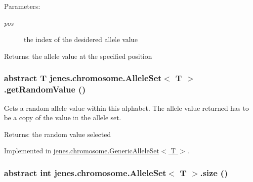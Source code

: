 \begin{Desc}
\item[Parameters:]
\begin{description}
\item[{\em pos}]the index of the desidered allele value \end{description}
\end{Desc}
\begin{Desc}
\item[Returns:]the allele value at the specified position \end{Desc}
\hypertarget{interfacejenes_1_1chromosome_1_1_allele_set_3_01_t_01_4_c09d409c55d941892df658d21b3d4bff}{
\subsubsection[getRandomValue]{\setlength{\rightskip}{0pt plus 5cm}abstract T jenes.chromosome.AlleleSet$<$ T $>$.getRandomValue ()}}
\label{interfacejenes_1_1chromosome_1_1_allele_set_3_01_t_01_4_c09d409c55d941892df658d21b3d4bff}


Gets a random allele value within this alphabet. The allele value returned has to be a copy of the value in the allele set. 

\begin{Desc}
\item[Returns:]the random value selected \end{Desc}


Implemented in \hyperlink{classjenes_1_1chromosome_1_1_generic_allele_set_3_01_t_01_4_2f330d71d992e0d724bc31730b56229e}{jenes.chromosome.GenericAlleleSet$<$ T $>$}.\hypertarget{interfacejenes_1_1chromosome_1_1_allele_set_3_01_t_01_4_3acbb10df92ebafc589d5d8546949f2f}{
\subsubsection[size]{\setlength{\rightskip}{0pt plus 5cm}abstract int jenes.chromosome.AlleleSet$<$ T $>$.size ()}}
\label{interfacejenes_1_1chromosome_1_1_allele_set_3_01_t_01_4_3acbb10df92ebafc589d5d8546949f2f}


